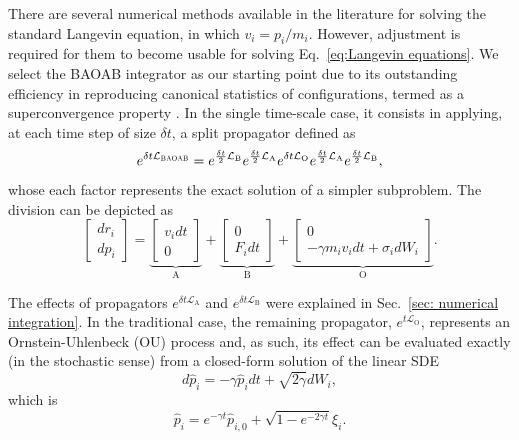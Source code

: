 \documentclass[
aip,
jcp,
reprint,
]{revtex4-1}
\begin{document}
There are several numerical methods available in the literature for solving the standard Langevin equation, in which $v_i = p_i/m_i$.
However, adjustment is required for them to become usable for solving Eq.~\eqref{eq:Langevin equations}.
We select the BAOAB integrator \cite{Leimkuhler_2012, Leimkuhler_2013_2} as our starting point due to its outstanding efficiency in reproducing canonical statistics of configurations, termed as a superconvergence property \cite{Leimkuhler_2012}.
In the single time-scale case, it consists in applying, at each time step of size $\delta t$, a split propagator defined as
\begin{equation}
e^{\delta t \mathcal{L}_\textsc{BAOAB}} =
e^{\frac{\delta t}{2} \mathcal{L}_\mathrm{B}}
e^{\frac{\delta t}{2} \mathcal{L}_\mathrm{A}}
e^{\delta t \mathcal{L}_\mathrm{O}}
e^{\frac{\delta t}{2} \mathcal{L}_\mathrm{A}}
e^{\frac{\delta t}{2} \mathcal{L}_\mathrm{B}},
\end{equation}
whose each factor represents the exact solution of a simpler subproblem.
The division can be depicted \cite{Leimkuhler_2015} as
\begin{equation}
\left[\begin{array}{c}
dr_i \\ dp_i
\end{array}\right] =
\underbrace{\left[\begin{array}{c}
v_i dt \\ 0
\end{array}\right]}_\mathrm{A} + 
\underbrace{\left[\begin{array}{c}
0 \\ F_i dt
\end{array}\right]}_\mathrm{B} +
\underbrace{\left[\begin{array}{c}
0 \\ -\gamma m_i v_i dt + \sigma_i dW_i
\end{array}\right]}_\mathrm{O}.
\end{equation}

The effects of propagators $e^{\delta t \mathcal{L}_\mathrm{A}}$ and $e^{\delta t \mathcal{L}_\mathrm{B}}$ were explained in Sec.~\ref{sec: numerical integration}.
In the traditional case, the remaining propagator, $e^{t \mathcal{L}_\mathrm{O}}$, represents an Ornstein-Uhlenbeck (OU) process and, as such, its effect can be evaluated exactly (in the stochastic sense) from a closed-form solution of the linear SDE
\begin{equation}
\label{eq:traditional Langevin}
d\hat{p}_i = - \gamma \hat{p}_i dt + \sqrt{2 \gamma} dW_i,
\end{equation}
which is
\begin{equation}
\label{eq:Ornestein-Uhlenbeck solution}
\hat{p}_i = e^{-\gamma t} \hat{p}_{i,0} + \sqrt{1 - e^{-2 \gamma t}} \xi_i.
\end{equation}
\end{document}
